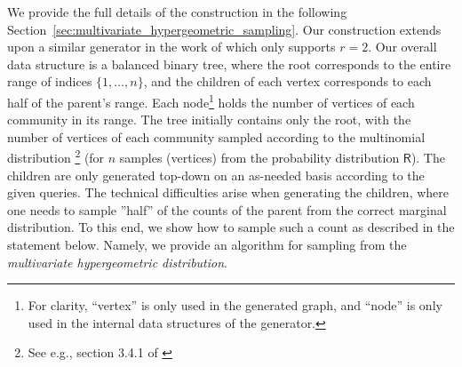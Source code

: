 We provide the full details of the construction in the following Section~\ref{sec:multivariate_hypergeometric_sampling}.
Our construction extends upon a similar generator in the work of \cite{huge} which only supports $r = 2$.
Our overall data structure is a balanced binary tree, where the root corresponds to the entire range of indices $\{1, \ldots, n\}$,
and the children of each vertex corresponds to each half of the parent's range.
Each node\footnote{For clarity, ``vertex'' is only used in the generated graph,
and ``node'' is only used in the internal data structures of the generator.}
holds the number of vertices of each community in its range.
The tree initially contains only the root, with the number of vertices of each community sampled according to the multinomial distribution
\footnote{See e.g., section 3.4.1 of \cite{knuth}} (for $n$ samples (vertices) from the probability distribution $\mathsf{R}$).
The children are only generated top-down on an as-needed basis according to the given queries.
The technical difficulties arise when generating the children,
where one needs to sample ''half'' of the counts of the parent from the correct marginal distribution.
To this end, we show how to sample such a count as described in the statement below.
Namely, we provide an algorithm for sampling from the \emph{multivariate hypergeometric distribution}.
